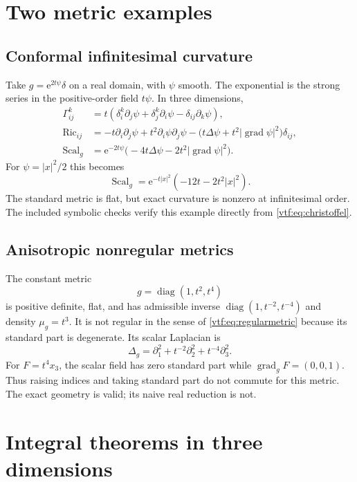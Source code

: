 \documentclass[11pt,letterpaper]{article}
\theoremstyle{definition}
\theoremstyle{remark}
\newcommand{\Ric}{\operatorname{Ric}}\newcommand{\Scal}{\operatorname{Scal}}
\newcommand{\grad}{\operatorname{grad}}\newcommand{\Div}{\operatorname{div}}
\newcommand{\e}{\mathrm e}
\begin{document}
\section{Two metric examples}\label{vtf:3d:sec:metricexamples}

\subsection{Conformal infinitesimal curvature}
Take $g=\e^{2t\psi}\delta$ on a real domain, with $\psi$ smooth. The exponential is the strong series in the positive-order field $t\psi$. In three dimensions,
\begin{align}
 \Gamma^k_{ij}&=t(\delta^k_i\partial_j\psi
              +\delta^k_j\partial_i\psi-\delta_{ij}\partial_k\psi),\\
 \Ric_{ij}&=-t\partial_i\partial_j\psi
 +t^2\partial_i\psi\partial_j\psi
 -\bigl(t\Delta\psi+t^2|\grad\psi|^2\bigr)\delta_{ij},\\
 \Scal_g&=\e^{-2t\psi}
 \bigl(-4t\Delta\psi-2t^2|\grad\psi|^2\bigr).\label{vtf:3d:eq:conformal}
\end{align}
For $\psi=|x|^2/2$ this becomes
\[
 \Scal_g=\e^{-t|x|^2}(-12t-2t^2|x|^2).
\]
The standard metric is flat, but exact curvature is nonzero at infinitesimal order. The included symbolic checks verify this example directly from \eqref{vtf:eq:christoffel}.

\subsection{Anisotropic nonregular metrics}\label{vtf:3d:subsec:anisotropic}
The constant metric
\[
 g=\operatorname{diag}(1,t^2,t^4)
\]
is positive definite, flat, and has admissible inverse
$\operatorname{diag}(1,t^{-2},t^{-4})$ and density $\mu_g=t^3$. It is not regular in the sense of \eqref{vtf:eq:regularmetric} because its standard part is degenerate. Its scalar Laplacian is
\[
 \Delta_g=\partial_1^2+t^{-2}\partial_2^2+t^{-4}\partial_3^2.
\]
For $F=t^4x_3$, the scalar field has zero standard part while
$\grad_gF=(0,0,1)$. Thus raising indices and taking standard part do not commute for this metric. The exact geometry is valid; its naive real reduction is not.

\section{Integral theorems in three dimensions}\label{vtf:3d:sec:integrals}
\end{document}
